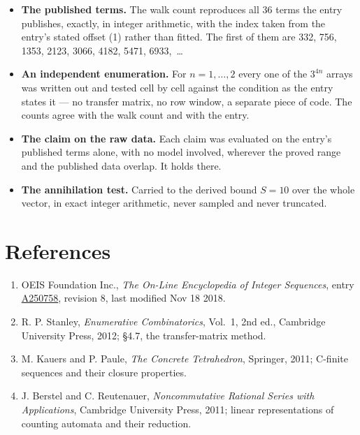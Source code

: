 \documentclass[11pt]{article}
\theoremstyle{definition}
\begin{document}
\begin{itemize}

\item {\bfseries The published terms.} The walk count reproduces all 36 terms the entry publishes, exactly, in integer arithmetic, with the index taken from the entry's stated offset (1) rather than fitted. The first of them are 332, 756, 1353, 2123, 3066, 4182, 5471, 6933,~\dots

\item {\bfseries An independent enumeration.} For $n = 1,\dots,2$ every one of the $3^{4n}$ arrays was written out and tested cell by cell against the condition as the entry states it --- no transfer matrix, no row window, a separate piece of code. The counts agree with the walk count and with the entry.

\item {\bfseries The claim on the raw data.} Each claim was evaluated on the entry's published terms alone, with no model involved, wherever the proved range and the published data overlap. It holds there.

\item {\bfseries The annihilation test.} Carried to the derived bound $S = 10$ over the whole vector, in exact integer arithmetic, never sampled and never truncated.

\end{itemize}

\section{References}

\begin{enumerate}

\item OEIS Foundation Inc., \emph{The On-Line Encyclopedia of Integer Sequences}, entry \href{https://oeis.org/A250758}{A250758}, revision 8, last modified Nov 18 2018.

\item R. P. Stanley, \emph{Enumerative Combinatorics}, Vol.~1, 2nd ed., Cambridge University Press, 2012; \S4.7, the transfer-matrix method.

\item M. Kauers and P. Paule, \emph{The Concrete Tetrahedron}, Springer, 2011; C-finite sequences and their closure properties.

\item J. Berstel and C. Reutenauer, \emph{Noncommutative Rational Series with Applications}, Cambridge University Press, 2011; linear representations of counting automata and their reduction.

\end{enumerate}
\end{document}
